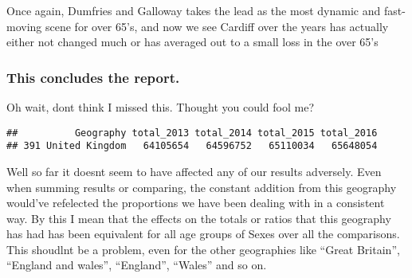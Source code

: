 \documentclass[]{article}
\newenvironment{Shaded}{\begin{snugshade}}{\end{snugshade}}
\newcommand{\KeywordTok}[1]{\textcolor[rgb]{0.13,0.29,0.53}{\textbf{#1}}}
\newcommand{\DecValTok}[1]{\textcolor[rgb]{0.00,0.00,0.81}{#1}}
\newcommand{\OperatorTok}[1]{\textcolor[rgb]{0.81,0.36,0.00}{\textbf{#1}}}
\newcommand{\NormalTok}[1]{#1}
\begin{document}
Once again, Dumfries and Galloway takes the lead as the most dynamic and
fast-moving scene for over 65's, and now we see Cardiff over the years
has actually either not changed much or has averaged out to a small loss
in the over 65's

\subsubsection{This concludes the
report.}\label{this-concludes-the-report.}

Oh wait, dont think I missed this. Thought you could fool me?

\begin{Shaded}
\end{Shaded}

\begin{verbatim}
##          Geography total_2013 total_2014 total_2015 total_2016
## 391 United Kingdom   64105654   64596752   65110034   65648054
\end{verbatim}

Well so far it doesnt seem to have affected any of our results
adversely. Even when summing results or comparing, the constant addition
from this geography would've refelected the proportions we have been
dealing with in a consistent way. By this I mean that the effects on the
totals or ratios that this geography has had has been equivalent for all
age groups of Sexes over all the comparisons. This shoudlnt be a
problem, even for the other geographies like ``Great Britain'',
``England and wales'', ``England'', ``Wales'' and so on.
\end{document}
